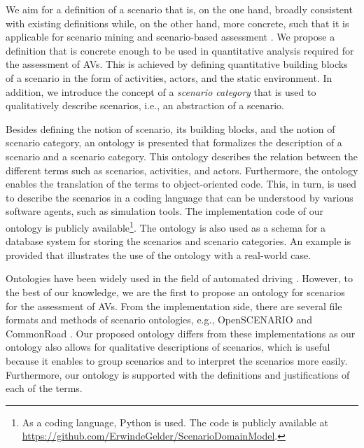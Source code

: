 We aim for a definition of a scenario that is, on the one hand, broadly consistent with existing definitions \autocite{geyer2014, ulbrich2015, elrofai2016scenario} while, on the other hand, more concrete, such that it is applicable for scenario mining \autocite{elrofai2016scenario} and scenario-based assessment \autocite{stellet2015taxonomy, deGelder2017assessment}. We propose a definition that is concrete enough to be used in quantitative analysis required for the assessment of AVs. This is achieved by defining quantitative building blocks of a scenario in the form of activities, actors, and the static environment. In addition, we introduce the concept of a \emph{scenario category}  
that is used to qualitatively describe scenarios, i.e., an abstraction of a scenario. 


Besides defining the notion of scenario, its building blocks, and the notion of scenario category, an ontology is presented that formalizes the description of a scenario and a scenario category. 
This ontology describes the relation between the different terms such as scenarios, activities, and actors.
Furthermore, the ontology enables the translation of the terms to object-oriented code.
This, in turn, is used to describe the scenarios in a coding language that can be understood by various software agents, such as simulation tools. \cstart The implementation code of our ontology is publicly available\footnote{\cstart As a coding language, Python is used. The code is publicly available at \url{https://github.com/ErwindeGelder/ScenarioDomainModel}.\cend}. \cend
The ontology is also used as a schema for a database system for storing the scenarios and scenario categories.
An example is provided that illustrates the use of the ontology with a real-world case.

\cstart Ontologies have been widely used in the field of automated driving \autocite{provine2004ontology, morignot2013ontology, schlenoff2003using, zhao2015core, maiti2017conceptualization, benvenuti2017ontologybased, bagschik2017ontology}. However, to the best of our knowledge, we are the first to propose an ontology for scenarios for the assessment of AVs. 
From the implementation side, there are several file formats and methods of scenario ontologies, e.g., OpenSCENARIO \autocite{openscenario} and CommonRoad \autocite{althoff2017CommonRoad}. Our proposed ontology differs from these implementations as our ontology also allows for qualitative descriptions of scenarios, which is useful because it enables to group scenarios and to interpret the scenarios more easily.
Furthermore, our ontology is supported with the definitions and justifications of each of the terms.\cend


